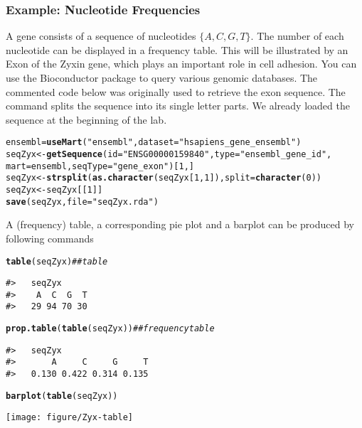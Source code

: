 \documentclass{article}\usepackage[]{graphicx}\usepackage[usenames,dvipsnames]{color}
\makeatletter
\def\maxwidth{ %
  \ifdim\Gin@nat@width>\linewidth
    \linewidth
  \else
    \Gin@nat@width
  \fi
}
\newcommand{\hlnum}[1]{\textcolor[rgb]{0.686,0.059,0.569}{#1}}%
\newcommand{\hlstr}[1]{\textcolor[rgb]{0.192,0.494,0.8}{#1}}%
\newcommand{\hlcom}[1]{\textcolor[rgb]{0.678,0.584,0.686}{\textit{#1}}}%
\newcommand{\hlstd}[1]{\textcolor[rgb]{0.345,0.345,0.345}{#1}}%
\newcommand{\hlkwb}[1]{\textcolor[rgb]{0.69,0.353,0.396}{#1}}%
\newcommand{\hlkwc}[1]{\textcolor[rgb]{0.333,0.667,0.333}{#1}}%
\newcommand{\hlkwd}[1]{\textcolor[rgb]{0.737,0.353,0.396}{\textbf{#1}}}%
\newenvironment{kframe}{%
 \def\at@end@of@kframe{}%
 \ifinner\ifhmode%
  \def\at@end@of@kframe{\end{minipage}}%
  \begin{minipage}{\columnwidth}%
 \fi\fi%
 \def\FrameCommand##1{\hskip\@totalleftmargin \hskip-\fboxsep
 \colorbox{shadecolor}{##1}\hskip-\fboxsep
     \hskip-\linewidth \hskip-\@totalleftmargin \hskip\columnwidth}%
 \MakeFramed {\advance\hsize-\width
   \@totalleftmargin\z@ \linewidth\hsize
   \@setminipage}}%
 {\par\unskip\endMakeFramed%
 \at@end@of@kframe}
\newenvironment{knitrout}{}{} %
\makeatother
\begin{document}
\subsubsection*{Example: Nucleotide Frequencies } 
A gene consists of a sequence of nucleotides $\{A, C, G, T \}$.
The number of each nucleotide can be displayed in a frequency table. This
will be illustrated by an Exon of the Zyxin gene, which plays an important role in cell
adhesion. You can use the Bioconductor package  to query
various genomic databases. The commented code below was originally used to retrieve the
exon sequence. The command  splits the sequence into
its single letter parts. We already loaded the sequence at the beginning of
the lab.


%
\begin{knitrout}
\color{fgcolor}\begin{kframe}
\begin{alltt}
\hlstd{ensembl}\hlkwb{=}  \hlkwd{useMart}\hlstd{(}\hlstr{"ensembl"}\hlstd{,}\hlkwc{dataset}\hlstd{=}\hlstr{"hsapiens_gene_ensembl"}\hlstd{)}
\hlstd{seqZyx} \hlkwb{<-} \hlkwd{getSequence}\hlstd{(}\hlkwc{id} \hlstd{=} \hlstr{"ENSG00000159840"}\hlstd{,} \hlkwc{type} \hlstd{=} \hlstr{"ensembl_gene_id"}\hlstd{,}
\hlkwc{mart} \hlstd{= ensembl,} \hlkwc{seqType} \hlstd{=} \hlstr{"gene_exon"}\hlstd{)[}\hlnum{1}\hlstd{,]}
\hlstd{seqZyx} \hlkwb{<-} \hlkwd{strsplit}\hlstd{(}\hlkwd{as.character}\hlstd{(seqZyx[}\hlnum{1}\hlstd{,}\hlnum{1}\hlstd{]),} \hlkwc{split} \hlstd{=} \hlkwd{character}\hlstd{(}\hlnum{0}\hlstd{))}
\hlstd{seqZyx} \hlkwb{<-} \hlstd{seqZyx[[}\hlnum{1}\hlstd{]]}
\hlkwd{save}\hlstd{(seqZyx,} \hlkwc{file} \hlstd{=} \hlstr{"seqZyx.rda"}\hlstd{)}
\end{alltt}
\end{kframe}
\end{knitrout}
%

A (frequency) table, a corresponding pie plot  and a barplot
can be produced by following commands

%
\begin{knitrout}
\color{fgcolor}\begin{kframe}
\begin{alltt}
\hlkwd{table}\hlstd{(seqZyx)} \hlcom{## table}
\end{alltt}
\begin{verbatim}
#>   seqZyx
#>    A  C  G  T 
#>   29 94 70 30
\end{verbatim}
\begin{alltt}
\hlkwd{prop.table}\hlstd{(}\hlkwd{table}\hlstd{(seqZyx))} \hlcom{## frequency table}
\end{alltt}
\begin{verbatim}
#>   seqZyx
#>       A     C     G     T 
#>   0.130 0.422 0.314 0.135
\end{verbatim}
\begin{alltt}
\hlkwd{barplot}\hlstd{(}\hlkwd{table}\hlstd{(seqZyx))}
\end{alltt}
\end{kframe}
\texttt{[image: figure/Zyx-table]} 

\end{knitrout}
\end{document}
